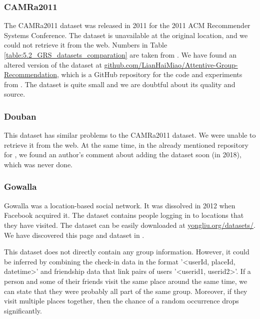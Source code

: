 \subsubsection{CAMRa2011} \label{subsubsec:04_group_datasets.overview.camra}
The CAMRa2011 dataset was released in 2011 for the 2011 ACM Recommender Systems Conference. The dataset is unavailable at the original location, and we could not retrieve it from the web. Numbers in Table \ref{table:5.2_GRS_datasets_comparation} are taken from \cite{attentative_group_recommendation}. We have found an altered version of the dataset at \newline \href{https://github.com/LianHaiMiao/Attentive-Group-Recommendation}{github.com/LianHaiMiao/Attentive-Group-Recommendation}, which is a GitHub repository for the code and experiments from \cite{attentative_group_recommendation}. The dataset is quite small and we are doubtful about its quality and source.


\subsubsection{Douban} \label{subsubsec:04_group_datasets.overview.douban}
This dataset has similar problems to the CAMRa2011 dataset. We were unable to retrieve it from the web. At the same time, in the already mentioned repository for \cite{attentative_group_recommendation}, we found an author's comment about adding the dataset soon (in 2018), which was never done.


\subsubsection{Gowalla} \label{subsubsec:04_group_datasets.overview.gowalla}
Gowalla was a location-based social network. It was dissolved in 2012 when Facebook acquired it. The dataset contains people logging in to locations that they have visited. The dataset can be easily downloaded at \href{https://www.yongliu.org/datasets/}{yongliu.org/datasets/}. We have discovered this page and dataset in \cite{gowalla_weeplaces_yelp}.

This dataset does not directly contain any group information. However, it could be inferred by combining the check-in data in the format '\textless userId, placeId, datetime\textgreater' and friendship data that link pairs of users '\textless userid1, userid2\textgreater'. If a person and some of their friends visit the same place around the same time, we can state that they were probably all part of the same group. Moreover, if they visit multiple places together, then the chance of a random occurrence drops significantly.

